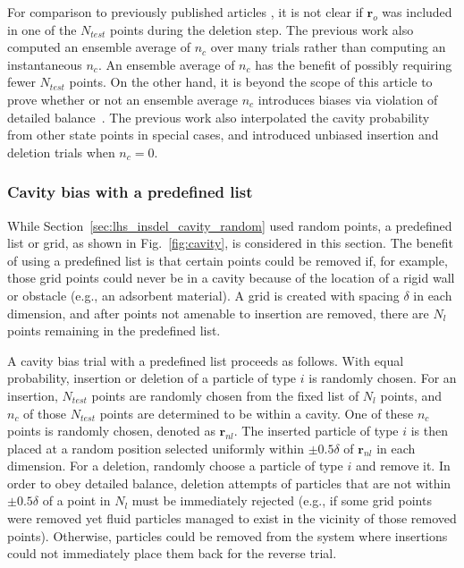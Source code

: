 \documentclass[
  9pt,
  bestpractices,
]{livecoms}
\begin{document}
For comparison to previously published articles \cite{mezei_cavity-biased_1980, mezei_grand-canonical_1987, snurr_prediction_1993}, it is not clear if $\mathbf{r}_o$ was included in one of the $N_{test}$ points during the deletion step.
The previous work also computed an ensemble average of $n_c$ over many trials rather than computing an instantaneous $n_c$.
An ensemble average of $n_c$ has the benefit of possibly requiring fewer $N_{test}$ points.
On the other hand, it is beyond the scope of this article to prove whether or not an ensemble average $n_c$ introduces biases via violation of detailed balance~\cite{ikeda_generalization_2024}.
The previous work also interpolated the cavity probability from other state points in special cases, and introduced unbiased insertion and deletion trials when $n_c=0$.

\subsubsection{\label{sec:lhs_insdel_cavity_testpoint}Cavity bias with a predefined list}

While Section~\ref{sec:lhs_insdel_cavity_random} used random points, a predefined list or grid, as shown in Fig.~\ref{fig:cavity}, is considered in this section.
The benefit of using a predefined list is that certain points could be removed if, for example, those grid points could never be in a cavity because of the location of a rigid wall or obstacle (e.g., an adsorbent material).
A grid is created with spacing $\delta$ in each dimension, and after points not amenable to insertion are removed, there are $N_l$ points remaining in the predefined list.

A cavity bias trial with a predefined list proceeds as follows.
With equal probability, insertion or deletion of a particle of type $i$ is randomly chosen.
For an insertion, $N_{test}$ points are randomly chosen from the fixed list of $N_l$ points, and $n_c$ of those $N_{test}$ points are determined to be within a cavity.
One of these $n_c$ points is randomly chosen, denoted as $\mathbf{r}_{nl}$.
The inserted particle of type $i$ is then placed at a random position selected uniformly within $\pm 0.5\delta$ of $\mathbf{r}_{nl}$ in each dimension.
For a deletion, randomly choose a particle of type $i$ and remove it.
In order to obey detailed balance, deletion attempts of particles that are not within $\pm 0.5\delta$ of a point in $N_l$ must be immediately rejected (e.g., if some grid points were removed yet fluid particles managed to exist in the vicinity of those removed points).
Otherwise, particles could be removed from the system where insertions could not immediately place them back for the reverse trial.
\end{document}
